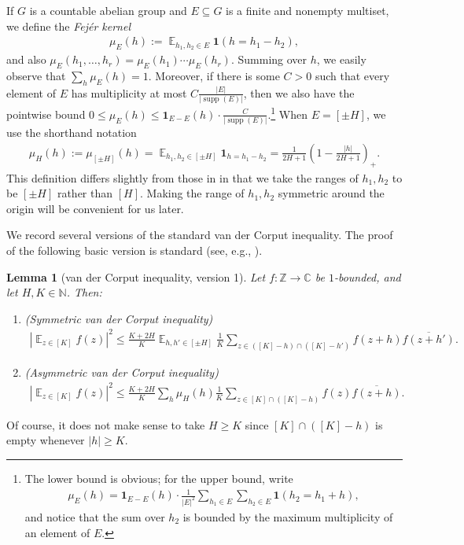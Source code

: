 \documentclass[11pt]{amsart}
\newtheorem{lemma}{Lemma}[section]
\theoremstyle{definition}
\DeclareMathOperator*{\E}{\mathbb{E}}
\newcommand{\C}{{\mathbb C}}
\newcommand{\N}{{\mathbb N}}
\newcommand{\Z}{{\mathbb Z}}
\DeclareMathOperator{\supp}{supp}
\newcommand{\abs}[1]{\mathopen{}\left| #1\mathclose{}\right|}
\newcommand{\brac}[1]{\mathopen{}\left( #1 \mathclose{}\right)}
\begin{document}
If $G$ is a countable abelian group and $E\subseteq G$ is a finite {and nonempty} multiset, we define the \textit{Fej\'er kernel}
\begin{align*}
    \mu_E(h) := \E_{h_1, h_2\in E}\mathbf{1}({h = h_1 - h_2}),
\end{align*}
and also $\mu_E(h_1, \ldots, h_r) = \mu_E(h_1)\cdots \mu_E(h_r)$.
Summing over $h$, we easily observe that $\sum_h \mu_E(h) = 1$. Moreover, if there is some $C>0$ such that every element of $E$ has multiplicity at most $C\frac{|E|}{|\supp(E)|}$, 
then we also have the pointwise bound $0\leq \mu_E(h)\leq \mathbf{1}_{E-E}(h)\cdot\frac{C}{|\supp(E)|}$.\footnote{The lower bound is obvious; for the upper bound, write
\begin{align*}
    \mu_E(h) = \mathbf{1}_{E-E}(h)\cdot\frac{1}{|E|^2}\sum_{h_1\in E}\sum_{h_2\in E}\mathbf{1}(h_2 = h_1 + h),
\end{align*}
and notice that the sum over $h_2$ is bounded by the maximum multiplicity of an element of $E$.} 
When $E = [\pm H]$, we use the shorthand notation
\begin{align*}
    \mu_H(h):=\mu_{[\pm H]}(h) = \E_{h_1, h_2\in[\pm H]} \mathbf{1}_{h = h_1 - h_2} = \frac{1}{2H+1}\brac{1-\frac{|h|}{2H+1}}_+.
\end{align*}
This definition differs slightly from those in \cite{Pel20, PP19, PP20, Pre17} in that we take the ranges of $h_1, h_2$ to be $[\pm H]$ rather than $[H]$. Making the range of $h_1, h_2$  symmetric around the origin will be convenient for us later.

We  record several versions of the standard van der Corput inequality.
The proof of the following basic version is standard (see, e.g., \cite[Lemma 3.2]{Pre17}).

\begin{lemma}[van der Corput inequality, version 1]\label{L: vdC 0}
    Let $f:\Z\to\C$ be $1$-bounded, and let $H, K\in\N$. Then: 
    \begin{enumerate}
        \item (Symmetric van der Corput inequality)
    \begin{align*}
        \abs{\E_{z\in[K]}f(z)}^2 \leq \frac{K+2H}{K}\E_{h, h'\in[\pm H]}\frac{1}{K}\sum_{z\in([K]-h)\cap([K]-h')}f(z + h)\overline{f(z+h')}.
    \end{align*}
        \item (Asymmetric van der Corput inequality)
            \begin{align*}
        \abs{\E_{z\in[K]}f(z)}^2 \leq \frac{K+2H}{K}\sum_{h}\mu_H(h)\frac{1}{K}\sum_{z\in[K]\cap([K]-h)}f(z)\overline{f(z+h)}.
    \end{align*}
    \end{enumerate}
\end{lemma}
    Of course, it does not make sense to take $H\geq K$ since $[K]\cap([K]-h)$ is empty whenever $|h|\geq K$.
    
\end{document}

